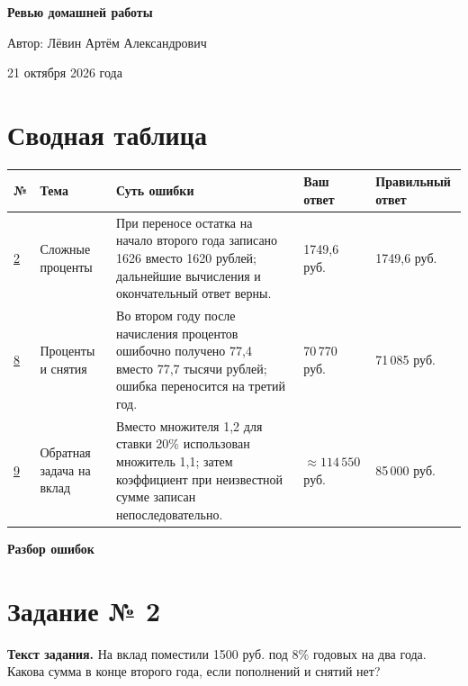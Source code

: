 \documentclass[12pt,a4paper]{article}
\begin{document}
\thispagestyle{empty}
\vspace*{45mm}
\begin{center}
{\LARGE\bfseries Ревью домашней работы\par}
\vspace{22mm}
{\large Автор: Лёвин Артём Александрович\par}
\vspace{9mm}
{\large 21 октября 2026 года\par}
\end{center}
\vfill
\begin{center}
\end{center}
\newpage
\section*{Сводная таблица}
\small
\begin{longtable}{@{}p{1.25cm}p{2.55cm}p{5.75cm}p{2.7cm}p{2.9cm}@{}}
\toprule
\textbf{№} & \textbf{Тема} & \textbf{Суть ошибки} & \textbf{Ваш ответ} & \textbf{Правильный ответ}\\
\midrule
\endhead
\hyperref[task:2]{2} & Сложные проценты & При переносе остатка на начало второго года записано 1626 вместо 1620 рублей; дальнейшие вычисления и окончательный ответ верны. & 1749,6 руб. & 1749,6 руб.\\
\midrule
\hyperref[task:8]{8} & Проценты и снятия & Во втором году после начисления процентов ошибочно получено 77,4 вместо 77,7 тысячи рублей; ошибка переносится на третий год. & 70\,770 руб. & 71\,085 руб.\\
\midrule
\hyperref[task:9]{9} & Обратная задача на вклад & Вместо множителя 1,2 для ставки 20\% использован множитель 1,1; затем коэффициент при неизвестной сумме записан непоследовательно. & $\approx114\,550$ руб. & 85\,000 руб.\\
\bottomrule
\end{longtable}
\normalsize
\newpage
\thispagestyle{empty}
\vspace*{\fill}
\begin{center}{\Huge\bfseries Разбор ошибок}\end{center}
\vspace*{\fill}
\newpage
{}\label{task:2}
\section*{Задание № 2}
\textbf{Текст задания.} На вклад поместили 1500 руб. под 8\% годовых на два года. Какова сумма в конце второго года, если пополнений и снятий нет?
\end{document}

